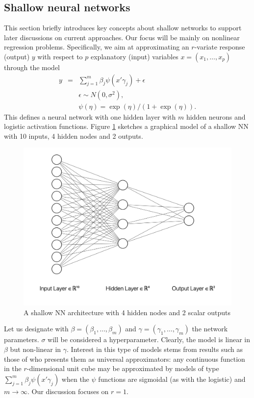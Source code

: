 \subsection{Shallow neural networks}
This section briefly introduces key concepts
about shallow networks to support later discussions on current approaches.
Our focus will be mainly on nonlinear regression 
problems. Specifically, we aim at approximating 
an $r$-variate response (output) $y$ with respect to $p$ explanatory 
(input) variables $x=(x_1,\ldots,x_p)$ through the 
model
\begin{eqnarray}\label{kantora}
  y         & = & \sum_{j=1}^m \beta_j \psi(x' \gamma_j) +
                    \epsilon %
                    \nonumber\\
              & & \epsilon \sim N(0,\sigma^2),
                  \nonumber \\
              & & \psi(\eta) = \exp(\eta)/(1+\exp(\eta)).
                  \end{eqnarray}
This defines a neural network with one hidden 
layer with $m$ hidden neurons and logistic 
activation functions.
Figure \ref{figuradkk1} sketches 
a graphical model of a shallow NN with 10 inputs, 4 hidden nodes and 
2 outputs. 
\begin{figure}
    \centering
    \includegraphics[scale=0.5]{figures/net1.png}
    \caption{A shallow NN architecture with 4 hidden nodes and 2 scalar outputs}
    \label{figuradkk1}
\end{figure}

Let us designate with $\beta=(\beta_1,\ldots,\beta_m)$ and $\gamma=(\gamma_1,\ldots,\gamma_m)$ the network parameters. $\sigma$  
will be considered a hyperparameter. Clearly, the model
is linear in $\beta$ but non-linear in  
$\gamma$. Interest in this type of models stems from 
results such as those of \textcite{cybenko1989approximation}
who presents them as universal approximators:
 any continuous function in the 
$r$-dimensional unit cube 
may be approximated by models of type
$\sum_{j=1}^m \beta_j \psi(x' \gamma_j)$
when the $\psi$
functions are sigmoidal (as with the logistic) and
$m\rightarrow \infty$. Our discussion focuses on $r=1$.



